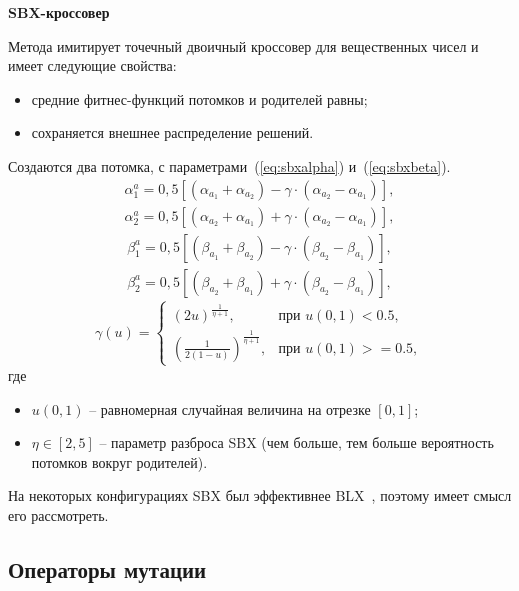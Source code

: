 \textbf{SBX-кроссовер}

Метода имитирует точечный двоичный кроссовер для вещественных чисел и имеет следующие свойства:

\begin{itemize}
	\item средние фитнес-функций потомков и родителей равны;
	\item сохраняется внешнее распределение решений.
\end{itemize}

Создаются два потомка, с параметрами~(\ref{eq:sbxalpha}) и~(\ref{eq:sbxbeta}).
\begin{equation}
\begin{split}
	\alpha^{a}_1 = 0,5 \left[(\alpha_{a_1} + \alpha_{a_2}) - \gamma \cdot (\alpha_{a_2} - \alpha_{a_1} )\right], \\ \alpha^{a}_2 = 0,5 \left[(\alpha_{a_2} + \alpha_{a_1}) + \gamma \cdot (\alpha_{a_2} - \alpha_{a_1})\right],
\end{split}
\label{eq:sbxalpha}
\end{equation}
\begin{equation}
\begin{split}
\beta^{a}_1 = 0,5 \left[(\beta_{a_1} + \beta_{a_2}) - \gamma \cdot (\beta_{a_2} - \beta_{a_1} )\right], \\ \beta^{a}_2 = 0,5 \left[(\beta_{a_2} + \beta_{a_1}) + \gamma \cdot (\beta_{a_2} - \beta_{a_1})\right],
\end{split}
\label{eq:sbxbeta}
\end{equation}
$$
\gamma(u) = \begin{cases}
	(2u)^{\frac{1}{\eta + 1}}, & \text{при } u(0,1) < 0.5, \\
	(\frac{1}{2(1 - u)})^{\frac{1}{\eta + 1}}, & \text{при } u(0,1) >= 0.5,
\end{cases}
$$
где
\begin{itemize}
	\item $u(0,1)$ -- равномерная случайная величина на отрезке $[0, 1]$;
	\item $\eta \in [2, 5]$ -- параметр разброса SBX (чем больше, тем больше вероятность потомков вокруг родителей).
\end{itemize}
На некоторых конфигурациях SBX был эффективнее BLX~\cite{genetic-engineer}, поэтому имеет смысл его рассмотреть.

\subsection{Операторы мутации}

